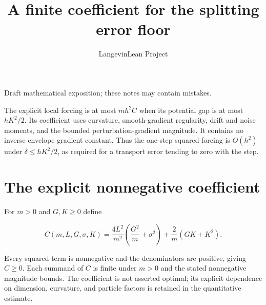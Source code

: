 \documentclass[11pt,a4paper]{article}
\title{\texorpdfstring{A finite coefficient for the splitting error floor}{A finite coefficient for the splitting error floor}}
\author{LangevinLean Project}
\date{}
\begin{document}
\maketitle
Draft mathematical exposition; these notes may contain mistakes.


The explicit local forcing is at most \(mh^2C\) when its potential gap is at most \(hK^2/2\). Its coefficient uses curvature, smooth-gradient regularity, drift and noise moments, and the bounded perturbation-gradient magnitude. It contains no inverse envelope gradient constant. Thus the one-step squared forcing is \(O(h^2)\) under \(\delta\le hK^2/2\), as required for a transport error tending to zero with the step.


\section{\texorpdfstring{The explicit nonnegative coefficient}{The explicit nonnegative coefficient}}


For \(m>0\) and \(G,K\ge0\) define

\[C(m,L,G,\sigma,K)=\frac{4L^2}{m^2}\left(\frac{G^2}{m}+\sigma^2\right)+\frac2m(GK+K^2).\]

Every squared term is nonnegative and the denominators are positive, giving \(C\ge0\). Each summand of \(C\) is finite under \(m>0\) and the stated nonnegative magnitude bounds. The coefficient is not asserted optimal; its explicit dependence on dimension, curvature, and particle factors is retained in the quantitative estimate.
\end{document}

